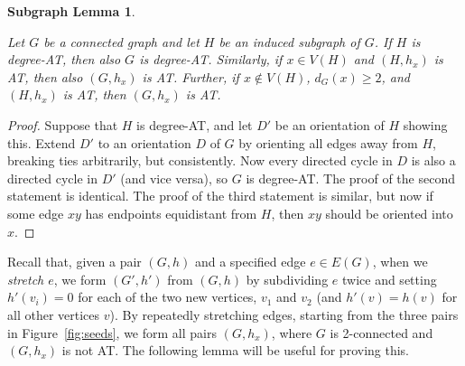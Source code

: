 \documentclass[12pt]{article}
\theoremstyle{plain}
\newtheorem*{subgraph}{Subgraph Lemma}
\theoremstyle{definition}
\theoremstyle{remark}
\begin{document}
	
	\begin{subgraph}
		\hypertarget{target:InducedSubgraph}{}
		Let $G$ be a connected graph and let $H$ be an induced subgraph of $G$.  If $H$
		is degree-AT, then also $G$ is degree-AT.  Similarly, if $x\in V(H)$ and
		$(H,h_x)$ is AT, then also $(G,h_x)$ is AT.  Further, if $x\notin V(H)$,
		$d_G(x)\ge 2$, and $(H,h_x)$ is AT, then $(G,h_x)$ is AT.  
	\end{subgraph}
	\begin{proof}
		Suppose that $H$ is degree-AT, and let $D'$ be an orientation of $H$ showing
		this.  Extend $D'$ to an orientation $D$ of $G$ by orienting all edges away from
		$H$, breaking ties arbitrarily, but consistently.  Now every directed cycle in
		$D$ is also a directed cycle in $D'$ (and vice versa), so $G$ is degree-AT.
		The proof of the second statement is identical.  The proof of the third
		statement is similar, but now if some edge $xy$ has endpoints equidistant from
		$H$, then $xy$ should be oriented into $x$.
	\end{proof}
	
	Recall that, given a pair $(G,h)$ and a specified edge $e\in E(G)$, when we
	\emph{stretch $e$}, we form $(G',h')$ from $(G,h)$ by subdividing $e$ twice
	and setting $h'(v_i)=0$ for each of the two new vertices, $v_1$ and $v_2$
	(and $h'(v)=h(v)$ for all other vertices $v$).  By repeatedly stretching edges,
	starting from the three pairs in Figure~\ref{fig:seeds}, we form all pairs
	$(G,h_x)$, where $G$ is 2-connected and $(G,h_x)$ is not AT.  
	The following lemma will be useful for proving this.
	
\end{document}
